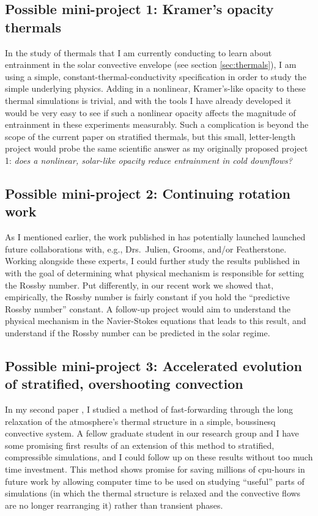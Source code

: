 \documentclass[aasms,12pt]{article}
\begin{document}
\subsection{Possible mini-project 1: Kramer's opacity thermals}
In the study of thermals that I am currently conducting to learn about entrainment in the
solar convective envelope (see section \ref{sec:thermals}), I am using a simple,
constant-thermal-conductivity specification in order to study the simple underlying physics.
Adding in a nonlinear, Kramer's-like opacity to these thermal simulations is trivial, and
with the tools I have already developed it would be very easy to see if such a nonlinear
opacity affects the magnitude of entrainment in these experiments measurably. Such a
complication is beyond the scope of the current paper on stratified thermals, but this
small, letter-length project would probe the same scientific answer as my originally proposed
project 1: \emph{does a nonlinear, solar-like opacity reduce entrainment in cold downflows?}

\subsection{Possible mini-project 2: Continuing rotation work}
\label{sec:future_rotation}
As I mentioned earlier, the work published in \citet{anders&all2019} has potentially launched
launched future collaborations with, e.g., Drs.~Julien, Grooms, and/or Featherstone.
Working alongside these experts, I could further study the results published in
\citet{anders&all2019} with the goal of determining what physical mechanism is
responsible for setting the Rossby number. Put differently, in our recent work we showed
that, empirically, the Rossby number is fairly constant if you hold the ``predictive
Rossby number'' constant. A follow-up project would aim to
understand the physical mechanism in the Navier-Stokes equations that leads to this
result, and understand if the Rossby number can be predicted in the solar regime.

\subsection{Possible mini-project 3: Accelerated evolution of stratified, overshooting convection}
In my second paper \citep{anders&all2018}, I studied a method of fast-forwarding through the long relaxation of the
atmosphere's thermal structure in a simple, boussinesq convective system. A fellow graduate student
in our research group and I have some promising first results of an extension of this method
to stratified, compressible simulations, and I could follow up on these results without
too much time investment. This method shows promise for saving millions 
of cpu-hours in future work by allowing computer time to be used on studying
``useful'' parts of simulations (in which the thermal structure is relaxed and the convective
flows are no longer rearranging it) rather than transient phases. 



\end{document}
